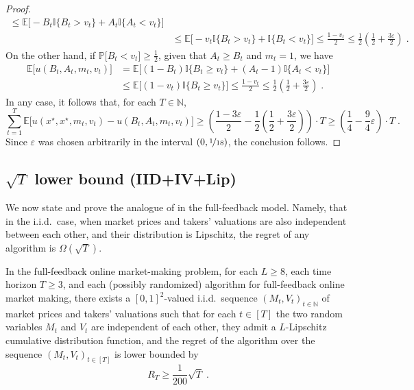 \documentclass[final,12pt]{colt2025}
\newcommand{\E}{\mathbb{E}}
\newcommand{\N}{\mathbb{N}}
\newcommand{\Pb}{\mathbb{P}}
\newcommand{\e}{\varepsilon}
\newcommand{\lrb}[1]{\left(#1\right)}
\newcommand{\bsb}[1]{\bigl[#1\bigr]}
\newcommand{\one}[1]{\mathbb{I}\{#1\}}
\newcommand{\util}{u}
\newcommand{\nP}{M}
\newcommand{\np}{m}
\newcommand{\nZ}{V}
\newcommand{\nz}{v}
\newcommand{\nB}{B}
\newcommand{\nS}{A}
\begin{document}
{\begin{proof}
\begin{align*}
\le
    \E\bsb{ - \nB_t \one{\nB_t > \nz_t } + \nS_t \one{\nS_t < \nz_t} }
\\ &\le 
    \E\bsb{ - \nz_t \one{\nB_t > \nz_t } + \one{\nB_t < \nz_t} }
\le
    \frac{1-\nz_t}{2}
\le
    \frac{1}{2}\lrb{\frac{1}{2} + \frac{3\e}{2}}\;.
\end{align*}
On the other hand, if $\Pb\bsb{ \nB_t < \nz_t }\ge\frac{1}{2}$, given that $\nS_t \ge \nB_t$ and $\np_t = 1$, we have
\begin{align*}
    \E\bsb{\util (\nB_t,\nS_t,\np_t,\nz_t) }
&=
    \E\bsb{ (1 - \nB_t) \one{\nB_t \ge \nz_t } + (\nS_t - 1) \one{\nS_t < \nz_t} }
\\
&\le
    \E\bsb{ (1- \nz_t) \one{\nB_t \ge \nz_t }}
\le
    \frac{1-\nz_t}{2}
\le
\frac{1}{2}\lrb{\frac{1}{2} + \frac{3\e}{2}}\;.
\end{align*}
In any case, it follows that, for each $T \in \N$,
\[
    \sum_{t=1}^T\E\bsb{\util(x^\star,x^\star,\np_t,\nz_t) - \util(\nB_t,\nS_t,\np_t,\nz_t)}
\ge
    \lrb{\frac{1-3 \e}{2} - \frac{1}{2} \lrb{\frac{1}{2} + \frac{3 \e}{2}}} \cdot T
\ge
    \lrb{\frac{1}{4} - \frac{9}{4} \e} \cdot T \;.
\]
Since $\e$ was chosen arbitrarily in the interval $(0, \nicefrac{1}{18})$, the conclusion follows.
\end{proof}
}


\subsection{\texorpdfstring{$\sqrt{T}$}{√T} lower bound (IID+IV+Lip)}
%
We now state and prove the analogue of  in the full-feedback model. Namely, that in the i.i.d.\ case, when market prices and takers' valuations are also independent between each other, and their distribution is Lipschitz, the regret of any algorithm is $\Omega(\sqrt{T})$.
\begin{theorem}
    \label{t:sqrtT-lower-full}
    In the full-feedback online market-making problem, 
    for each $L \ge 8$, each time horizon $T \ge 3$, and each (possibly randomized) algorithm for full-feedback online market making, there exists a $[0,1]^2$-valued i.i.d.\ sequence $(\nP_t,\nZ_t)_{t \in \N}$ of market prices and takers' valuations such that for each $t \in [T]$ the two random variables $\nP_t$ and $\nZ_t$ are independent of each other, they admit a $L$-Lipschitz cumulative distribution function, and the regret of the algorithm over the sequence $(\nP_t,\nZ_t)_{t \in [T]}$ is lower bounded by
    \[
        R_T \ge \frac{1}{200} \sqrt{T}\;.
    \] 
\end{theorem}
\end{document}
